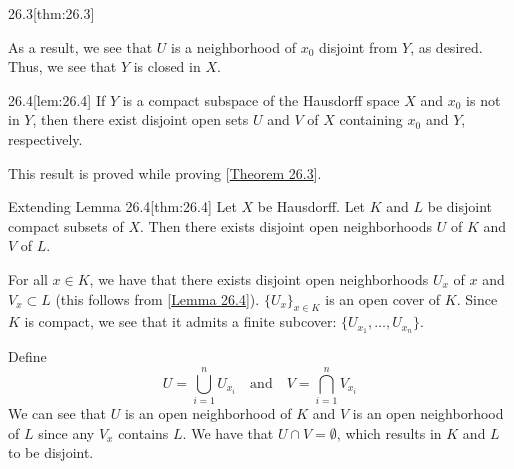 \begin{thmBox}{26.3}[thm:26.3]
\begin{proofBox}
        As a result, we see that \( U \) is a neighborhood of \( x_{ 0 } \) 
        disjoint from \( Y \), as desired.
        Thus, we see that \( Y \) is closed in \( X \).
    \end{proofBox}
\end{thmBox}

\begin{thmBox}[Lemma]{26.4}[lem:26.4]
    If \( Y \) is a compact subspace of the Hausdorff space \( X \) and 
    \( x_{ 0 } \) is not in \( Y \), then there exist disjoint open sets
    \( U \) and \( V \) of \( X \) containing \( x_{ 0 } \) and \( Y \),
    respectively.

    \baseRule

    \begin{proofBox}
        This result is proved while proving 
        [\hyperlink{thm:26.3}{Theorem 26.3}].
    \end{proofBox}
\end{thmBox}

\begin{thmBox}{Extending Lemma 26.4}[thm:26.4]
    Let \( X \) be Hausdorff. 
    Let \( K \) and \( L \) be disjoint compact subsets of \( X \).
    Then there exists disjoint open neighborhoods \( U \) of \( K \)
    and \( V \) of \( L \).

    \baseRule

    \begin{proofBox}
        For all \( x \in K \), we have that there exists disjoint open 
        neighborhoods \( U_{ x } \) of \( x \) and \( V_{ x } \subset L \)
        (this follows from [\hyperlink{lem:26.4}{Lemma 26.4}]).
        \( \{ U_{ x } \}_{ x \in K } \) is an open cover of \( K \).
        Since \( K \) is compact, we see that it admits a finite subcover:
        \( \{ U_{ x_{ 1 } } , \ldots ,  U_{ x_{ n } } \} \).

        \baseSkip

        Define 
        \begin{equation*}
            U
            =
            \bigcup_{ i = 1 }^{ n } U_{ x_{ i } }
            \quad \mathrm{and} \quad 
            V
            =
            \bigcap_{ i = 1 }^{ n } V_{ x_{ i } }
        \end{equation*}
        We can see that \( U \) is an open neighborhood of \( K \) and \( V \)
        is an open neighborhood of \( L \) since any \( V_{ x } \) contains 
        \( L \).
        We have that \( U \cap V = \emptyset \), which results in \( K \) and
        \( L \) to be disjoint. 
    \end{proofBox}
\end{thmBox}

